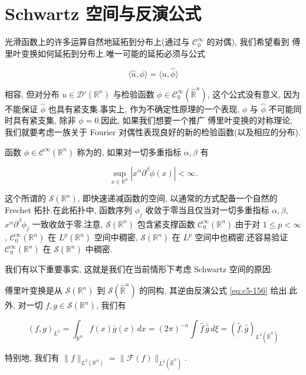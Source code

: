 \section{Schwartz 空间与反演公式}

光滑函数上的许多运算自然地延拓到分布上(通过与 $\mathcal{C}_0^\infty$ 的对偶), 我们希望看到 傅里叶变换如何延拓到分布上.唯一可能的延拓必须与公式

\[
\langle\hat{u}, \phi\rangle = \langle u, \hat{\phi}\rangle
\]

相容, 但对分布 $u\in\mathcal{D}'(\mathbb{R}^n)$ 与检验函数 $\phi\in\mathcal{C}_0^\infty(\widehat{\mathbb{R}}^n)$, 这个公式没有意义, 因为不能保证 $\hat{\phi}$ 也具有紧支集.事实上, 作为不确定性原理的一个表现, $\phi$ 与 $\hat{\phi}$ 不可能同时具有紧支集, 除非 $\phi = 0$.因此, 如果我们想要一个推广 傅里叶变换的对称理论, 我们就要考虑一族关于 Fourier 对偶性表现良好的新的检验函数(以及相应的分布).

\begin{definition}\label{def:c5-2.1}
函数 $\phi\in\mathcal{C}^\infty(\mathbb{R}^n)$ 称为的, 如果对一切多重指标 $\alpha, \beta$ 有

\[
\sup_{x\in\mathbb{R}^n}|x^\alpha\partial^\beta\phi(x)| < \infty.
\]
\end{definition}

这个所谓的  $\mathcal{S}(\mathbb{R}^n)$, 即快速递减函数的空间, 以通常的方式配备一个自然的 Frechet 拓扑.在此拓扑中, 函数序列 $\phi_j$ 收敛于零当且仅当对一切多重指标 $\alpha, \beta$, $x^\alpha\partial^\beta\phi_j$ 一致收敛于零.注意, $\mathcal{S}(\mathbb{R}^n)$ 包含紧支撑函数 $\mathcal{C}_0^\infty(\mathbb{R}^n)$.由于对 $1\leq p<\infty$, $\mathcal{C}_0^\infty(\mathbb{R}^n)$ 在 $L^p(\mathbb{R}^n)$ 空间中稠密, $\mathcal{S}(\mathbb{R}^n)$ 在 $L^p$ 空间中也稠密.还容易验证 $\mathcal{C}_0^\infty(\mathbb{R}^n)$ 在 $\mathcal{S}(\mathbb{R}^n)$ 中稠密.

我们有以下重要事实, 这就是我们在当前情形下考虑 Schwartz 空间的原因:

\begin{proposition}\label{prop:c5-2.2}
傅里叶变换是从 $\mathcal{S}(\mathbb{R}^n)$ 到 $\mathcal{S}(\widehat{\mathbb{R}}^n)$ 的同构, 其逆由反演公式 \eqref{eq:c5-156} 给出.此外, 对一切 $f, g\in\mathcal{S}(\mathbb{R}^n)$, 我们有 

\begin{equation}
(f, g)_{L^2} = \int_{\mathbb{R}^n} f(x)\bar{g}(x)\, dx = (2\pi)^{-n}\int\hat{f}\, \overline{\hat{g}}\, d\xi = (\hat{f}, \hat{g})_{L^2(\widehat{\mathbb{R}}^n)}\label{eq:c5-160}
\end{equation}

特别地, 我们有  $\|f\|_{L^2(\mathbb{R}^n)} = \|\mathcal{F}(f)\|_{L^2(\widehat{\mathbb{R}}^n)}$.
\end{proposition}


